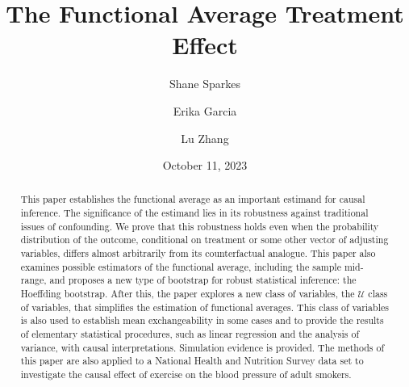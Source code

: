 \documentclass[12pt]{amsart}
\theoremstyle{plain}%
\theoremstyle{definition}
\theoremstyle{remark}
\numberwithin{equation}{section}
\begin{document}
\title{The Functional Average Treatment Effect}

\author{Shane Sparkes}
\address{Department of Population and Public Health Sciences, University of Southern California, Los Angeles, California 90033}

\author{Erika Garcia}
\address{Department of Population and Public Health Sciences, University of Southern California, Los Angeles, California 90033}

\author{Lu Zhang}
\address{Department of Population and Public Health Sciences, University of Southern California, Los Angeles, California 90033}



\date{October 11, 2023}



\begin{abstract}
This paper establishes the functional average as an important estimand for causal inference. The significance of the estimand lies in its robustness against traditional issues of confounding. We prove that this robustness holds even when the probability distribution of the outcome, conditional on treatment or some other vector of adjusting variables, differs almost arbitrarily from its counterfactual analogue. This paper also examines possible estimators of the functional average, including the sample mid-range, and proposes a new type of bootstrap for robust statistical inference: the Hoeffding bootstrap. After this, the paper explores a new class of variables, the $\mathcal{U}$ class of variables, that simplifies the estimation of functional averages. This class of variables is also used to establish mean exchangeability in some cases and to provide the results of elementary statistical procedures, such as linear regression and the analysis of variance, with causal interpretations. Simulation evidence is provided. The methods of this paper are also applied to a National Health and Nutrition Survey data set to investigate the causal effect of exercise on the blood pressure of adult smokers.
\end{abstract}
\end{document}

